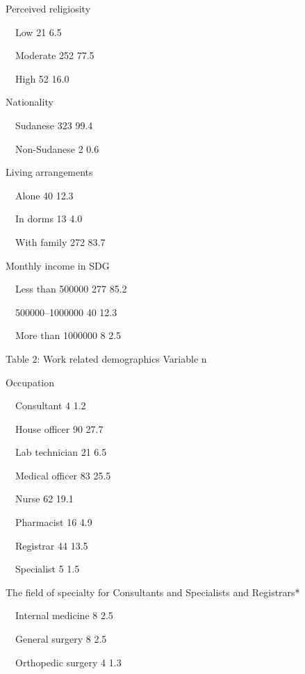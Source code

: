 Perceived religiosity 



 Low                                                  
21
6.5%

 Moderate                                             
252
77.5%

 High                                                
52
16.0%

Nationality 



 Sudanese 
323
99.4%

 Non-Sudanese 
2
0.6%

Living arrangements 



 Alone                                                    
40    
12.3%

 In dorms                                                 
13    
4.0%

 With family                                              
272   
83.7%

Monthly income in SDG 



 Less than 500000                                        
277   
85.2%

 500000–1000000                                        
40    
12.3%

 More than 1000000                                      
8     
2.5%





Table 2: Work related demographics
Variable
n
%

Occupation



 Consultant 
4
1.2%

 House officer
90
27.7%

 Lab technician
21
6.5%

 Medical officer 
83
25.5%

 Nurse 
62
19.1%

 Pharmacist
16
4.9%

 Registrar
44
13.5%

 Specialist 
5
1.5%

The field of specialty for Consultants and Specialists and Registrars*



 Internal medicine
8
2.5%

 General surgery
8
2.5%

 Orthopedic surgery
4
1.3%

